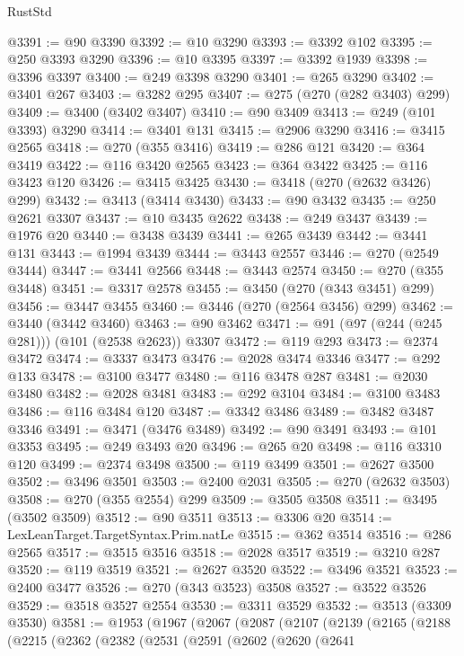 \begin{lexlean}{RustStd}
\begin{coremodule}
@3391 := @90 @3390
@3392 := @10 @3290
@3393 := @3392 @102
@3395 := @250 @3393 @3290
@3396 := @10 @3395
@3397 := @3392 @1939
@3398 := @3396 @3397
@3400 := @249 @3398 @3290
@3401 := @265 @3290
@3402 := @3401 @267
@3403 := @3282 @295
@3407 := @275 (@270 (@282 @3403) @299)
@3409 := @3400 (@3402 @3407)
@3410 := @90 @3409
@3413 := @249 (@101 @3393) @3290
@3414 := @3401 @131
@3415 := @2906 @3290
@3416 := @3415 @2565
@3418 := @270 (@355 @3416)
@3419 := @286 @121
@3420 := @364 @3419
@3422 := @116 @3420 @2565
@3423 := @364 @3422
@3425 := @116 @3423 @120
@3426 := @3415 @3425
@3430 := @3418 (@270 (@2632 @3426) @299)
@3432 := @3413 (@3414 @3430)
@3433 := @90 @3432
@3435 := @250 @2621 @3307
@3437 := @10 @3435 @2622
@3438 := @249 @3437
@3439 := @1976 @20
@3440 := @3438 @3439
@3441 := @265 @3439
@3442 := @3441 @131
@3443 := @1994 @3439
@3444 := @3443 @2557
@3446 := @270 (@2549 @3444)
@3447 := @3441 @2566
@3448 := @3443 @2574
@3450 := @270 (@355 @3448)
@3451 := @3317 @2578
@3455 := @3450 (@270 (@343 @3451) @299)
@3456 := @3447 @3455
@3460 := @3446 (@270 (@2564 @3456) @299)
@3462 := @3440 (@3442 @3460)
@3463 := @90 @3462
@3471 := @91 (@97 (@244 (@245 @281))) (@101 (@2538 @2623)) @3307
@3472 := @119 @293
@3473 := @2374 @3472
@3474 := @3337 @3473
@3476 := @2028 @3474 @3346
@3477 := @292 @133
@3478 := @3100 @3477
@3480 := @116 @3478 @287
@3481 := @2030 @3480
@3482 := @2028 @3481
@3483 := @292 @3104
@3484 := @3100 @3483
@3486 := @116 @3484 @120
@3487 := @3342 @3486
@3489 := @3482 @3487 @3346
@3491 := @3471 (@3476 @3489)
@3492 := @90 @3491
@3493 := @101 @3353
@3495 := @249 @3493 @20
@3496 := @265 @20
@3498 := @116 @3310 @120
@3499 := @2374 @3498
@3500 := @119 @3499
@3501 := @2627 @3500
@3502 := @3496 @3501
@3503 := @2400 @2031
@3505 := @270 (@2632 @3503)
@3508 := @270 (@355 @2554) @299
@3509 := @3505 @3508
@3511 := @3495 (@3502 @3509)
@3512 := @90 @3511
@3513 := @3306 @20
@3514 := LexLeanTarget.TargetSyntax.Prim.natLe
@3515 := @362 @3514
@3516 := @286 @2565
@3517 := @3515 @3516
@3518 := @2028 @3517
@3519 := @3210 @287
@3520 := @119 @3519
@3521 := @2627 @3520
@3522 := @3496 @3521
@3523 := @2400 @3477
@3526 := @270 (@343 @3523) @3508
@3527 := @3522 @3526
@3529 := @3518 @3527 @2554
@3530 := @3311 @3529
@3532 := @3513 (@3309 @3530)
@3581 := @1953
    (@1967
      (@2067
        (@2087
          (@2107
            (@2139
              (@2165
                (@2188
                  (@2215
                    (@2362
                      (@2382
                        (@2531
                          (@2591
                            (@2602
                              (@2620
                                (@2641

\end{coremodule}
\end{lexlean}

